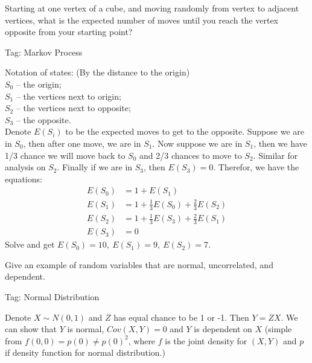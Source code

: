 \begin{exe}
Starting at one vertex of a cube, and moving randomly from
vertex to adjacent vertices, what is the expected number of moves until you
reach the vertex opposite from your starting point?
\end{exe}
\begin{teacher}
Tag: Markov Process
\begin{sol}
Notation of states: (By the distance to the origin)\\
$S_0$ -- the origin;\\
$S_1$ -- the vertices next to origin;\\
$S_2$ -- the vertices next to opposite;\\
$S_3$ -- the opposite.\\
Denote $E(S_i)$ to be the expected moves to get to the opposite. Suppose we are in $S_0$, then after one move, we are in $S_1$. Now suppose we are in $S_1$, then we have 1/3 chance we will move back to $S_0$ and 2/3 chances to move to $S_2$. Similar for analysis on $S_2$. Finally if we are in $S_3$, then $E(S_3)=0$. Therefor, we have the equations:
\begin{align*}
E(S_0) &= 1+E(S_1)\\    
E(S_1) &= 1+\frac{1}{3}E(S_0)+\frac{2}{3}E(S_2)\\
E(S_2) &= 1+\frac{1}{3}E(S_3)+\frac{2}{3}E(S_1)\\
E(S_3) &= 0
\end{align*}
Solve and get $E(S_0)=10,\ E(S_1) =9,\ E(S_2) = 7$.
\end{sol}
\end{teacher}

\begin{exe}
Give an example of random variables that are normal, uncorrelated, and dependent.
\end{exe}
\begin{teacher}
Tag: Normal Distribution
\begin{sol}
Denote $X\sim N(0,1)$ and $Z$ has equal chance to be 1 or -1. Then $Y=ZX$. We can show that $Y$ is normal, $Cov(X, Y)=0$ and $Y$ is dependent on $X$ (simple from $f(0, 0) = p(0)\neq p(0)^2$, where $f$ is the joint density for $(X, Y)$ and $p$ if density function for normal distribution.)
\end{sol}
\end{teacher}

